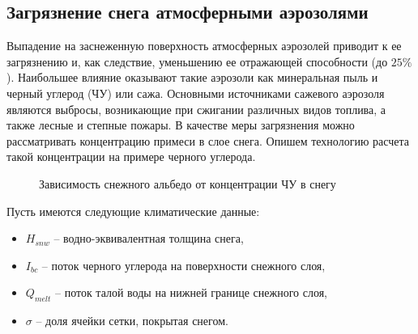 \documentclass[a4paper, fontsize=14pt]{scrartcl}
\begin{document}
\subsection{Загрязнение снега атмосферными аэрозолями}

Выпадение на заснеженную поверхность атмосферных аэрозолей приводит к ее загрязнению и, как следствие, уменьшению ее отражающей способности (до $25 \%$). Наибольшее влияние оказывают такие аэрозоли как минеральная пыль и черный углерод (ЧУ) или сажа. Основными источниками сажевого аэрозоля являются выбросы, возникающие при сжигании различных видов топлива, а также лесные и степные пожары. В качестве меры загрязнения можно рассматривать концентрацию примеси в слое снега. Опишем технологию расчета такой концентрации на примере черного углерода.



\begin{figure}[h]
    \caption{Зависимость снежного альбедо от концентрации ЧУ в снегу}
    \label{fig:image}
\end{figure}

\newpage
Пусть имеются следующие климатические данные:
\begin{itemize}
    \item $H_{snw}$ -- водно-эквивалентная толщина снега, 
    \item $I_{bc}$ -- поток черного углерода на поверхности снежного слоя, 
    \item $Q_{melt}$ -- поток талой воды на нижней границе снежного слоя,
    \item $\sigma$ -- доля ячейки сетки, покрытая снегом.
\end{itemize}
\end{document}
